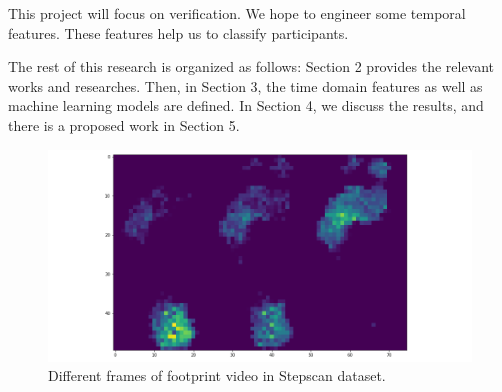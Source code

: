 
This project will focus on verification. We hope to engineer some temporal features. These features help us to classify participants. 

The rest of this research is organized as follows: Section 2 provides the relevant works and researches. Then, in Section 3, the time domain features as well as machine learning models are defined. In Section 4, we discuss the results, and there is a proposed work in Section 5.


\begin{figure}
    \centering
    \begin{minipage}[b]{.5\textwidth}
        \includegraphics[width=\textwidth]{figures/project/frame1.png}
    \end{minipage}
    \caption{Different frames of footprint video in Stepscan dataset.}
    \label{fig:Stepscan_dataset}
\end{figure}


